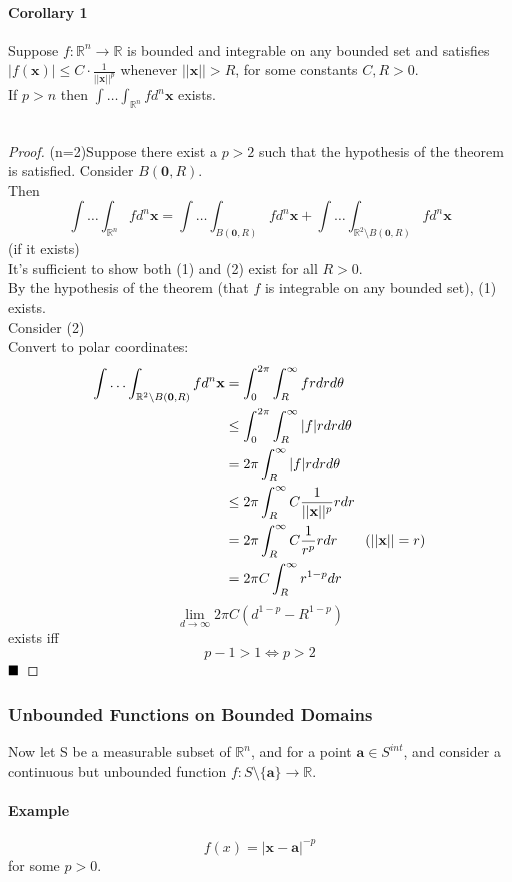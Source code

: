 \documentclass[11pt]{article}
\newcommand{\tb}[1]{\textbf{#1}}
\newcommand{\real}[0]{\mathbb{R}}
\newcommand{\vx}[0]{\tb{x}}
\newcommand{\vo}[0]{\tb{0}}
\newcommand{\va}[0]{\tb{a}}
\newcommand{\qed}[0]{$\hfill\blacksquare$}
\begin{document}
\paragraph{Corollary 1} Suppose $f:\real^n \rightarrow \real$ is bounded and integrable on any bounded set and satisfies $|f(\vx)| \leq C \cdot \frac{1}{||\vx||^p}$ whenever $||\vx|| > R$, for some constants $C,R > 0$.\\
If $p>n$ then $\int\hdots \int_{\real^n}fd^n\vx$ exists.\\\\
\begin{proof}
(n=2)Suppose there exist a $p > 2$ such that the hypothesis of the theorem is satisfied. Consider $B(\vo,R)$.\\
Then $$\int\hdots \int_{\real^n}fd^n\vx = \int\hdots \int_{B(\vo,R)}fd^n\vx + \int\hdots \int_{\real^2 \setminus B(\vo, R)}fd^n\vx$$
(if it exists)\\
It's sufficient to show both (1) and (2) exist for all $R>0$.\\
By the hypothesis of the theorem (that $f$ is integrable on any bounded set), (1) exists.\\
Consider (2)\\
Convert to polar coordinates:
\begin{align*}
	\int\hdots \int_{\real^2 \setminus B(\vo, R)}fd^n\vx &= \int_0^{2\pi}\int_R^\infty frdrd\theta\\
	&\leq \int_0^{2\pi}\int_R^\infty|f|rdrd\theta\\
	&= 2\pi \int_R^\infty|f|rdrd\theta\\
	&\leq 2\pi \int_R^\infty C \frac{1}{||\vx||^p}rdr\\
	&= 2\pi \int_R^\infty C \frac{1}{r^p}rdr \tag{$||\vx|| = r$}\\
	&= 2\pi C\int_R^\infty r^{1-p}dr\\
\end{align*}
$$\underset{d\rightarrow\infty}{\lim}2\pi C(d^{1-p}-R^{1-p})$$ exists iff $$ p - 1> 1 \iff p>2$$ \qed
\end{proof}

\subsubsection{Unbounded Functions on Bounded Domains}
Now let S be a measurable subset of $\real^n$, and for a point $\tb{a} \in S^{int}$, and consider a continuous but unbounded function $f: S\setminus\{\va\} \rightarrow \real$.\\
\paragraph{Example} $$f(x) = |\vx - \va|^{-p}$$ for some $p>0$.
\end{document}
